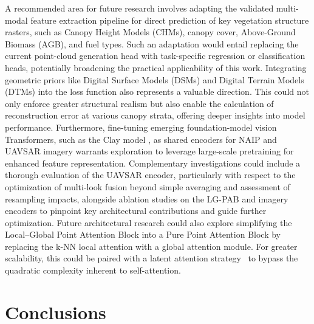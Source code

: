 \documentclass[remotesensing,article,accept,pdftex,moreauthors]{Definitions/mdpi}
\begin{document}
\newpage

A recommended area for future research involves adapting the validated multi-modal feature extraction pipeline for direct prediction of key vegetation structure rasters, such as Canopy Height Models (CHMs), canopy cover, Above-Ground Biomass (AGB), and fuel types. Such an adaptation would entail replacing the current point-cloud generation head with task-specific regression or classification heads, potentially broadening the practical applicability of this work. Integrating geometric priors like Digital Surface Models (DSMs) and Digital Terrain Models (DTMs) into the loss function also represents a valuable direction. This could not only enforce greater structural realism but also enable the calculation of reconstruction error at various canopy strata, offering deeper insights into model performance. Furthermore, fine-tuning emerging foundation-model vision Transformers, such as the Clay model \cite{clay_model_v1p5}, as shared encoders for NAIP and UAVSAR imagery warrants exploration to leverage large-scale pretraining for enhanced feature representation. Complementary investigations could include a thorough evaluation of the UAVSAR encoder, particularly with respect to the optimization of multi-look fusion beyond simple averaging and assessment of resampling impacts, alongside ablation studies on the LG-PAB and imagery encoders to pinpoint key architectural contributions and guide further optimization. Future architectural research could also explore simplifying the Local--Global Point Attention Block into a Pure Point Attention Block by replacing the k-NN local attention with a global attention module. For greater scalability, this could be paired with a latent attention \mbox{strategy \cite{liu2024deepseek}} to bypass the quadratic complexity inherent to self-attention.


\section{Conclusions}
\end{document}
